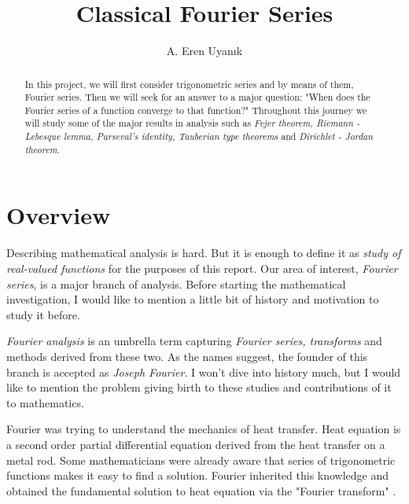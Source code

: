 \documentclass[12pt]{amsart}
\theoremstyle{definition}
\begin{document}
\title[Classical Fourier Series]{Classical Fourier Series}


\author{A. Eren Uyanık}


\begin{abstract}

In this project, we will first consider trigonometric series and by means of them, Fourier series. Then we will seek for an answer to a major question: "When does the Fourier series of a function converge to that function?" Throughout this journey we will study some of the major results in analysis such as \emph{Fejer theorem, Riemann - Lebesque lemma, Parseval's identity, Tauberian type theorems} and \emph{Dirichlet - Jordan theorem}.
\end{abstract}
\maketitle


\section*{Overview} %





Describing mathematical analysis is hard. But it is enough to define it as \emph{study of real-valued functions} \cite{History} for the purposes of this report. Our area of interest, \emph{Fourier series}, is a major branch of analysis. Before starting the mathematical investigation, I would like to mention a little bit of history and motivation to study it before. 


\emph{Fourier analysis} is an umbrella term capturing \emph{Fourier series, transforms} and methods derived from these two. As the names suggest, the founder of this branch is accepted as \emph{Joseph Fourier}. I won't dive into history much, but I would like to mention the problem giving birth to these studies and contributions of it to mathematics.


Fourier was trying to understand the mechanics of heat transfer. Heat equation is a second order partial differential equation derived from the heat transfer on a metal rod. Some mathematicians were already aware that series of trigonometric functions makes it easy to find a solution. Fourier inherited this knowledge and obtained the fundamental solution to heat equation via the "Fourier transform" \cite{History}.
\end{document}
